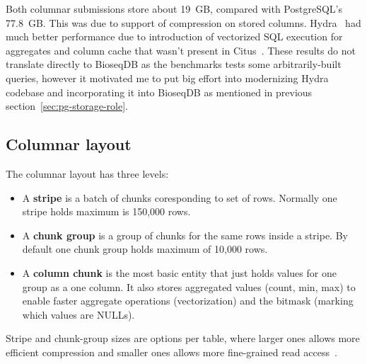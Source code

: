 Both columnar submissions store about 19~GB, compared with PostgreSQL's
77.8~GB. This was due to support of compression on stored columns. Hydra~\autocite{hydra_columnar_source} had much better performance due to introduction of vectorized SQL execution for aggregates and column cache that wasn't present in Citus~\autocite{citus_distributed_2021}.
These results do not translate directly to BioseqDB as the benchmarks tests some arbitrarily-built queries, however it motivated me to put big effort into modernizing Hydra codebase and incorporating it into BioseqDB as mentioned in previous section~\ref{sec:pg-storage-role}.

\subsection{Columnar layout}


  

The columnar layout has three levels:

\begin{itemize}
  \item A \textbf{stripe} is a batch of chunks coresponding to set of rows. Normally one stripe holds maximum is 150,000 rows.
  \item A \textbf{chunk group} is a group of chunks for the same rows inside a stripe. By default one chunk group holds maximum of 10,000 rows.
  \item A \textbf{column chunk} is the most basic entity that just holds values for one group as a one column. It also stores aggregated values (count, min, max) to enable 
  faster aggregate operations (vectorization) and the bitmask (marking which values are NULLs).
\end{itemize}

Stripe and chunk-group sizes are options per table, where larger ones allows more efficient compression and smaller ones allows more fine-grained read access~\autocite{citus_columnar_compression_2021}.

